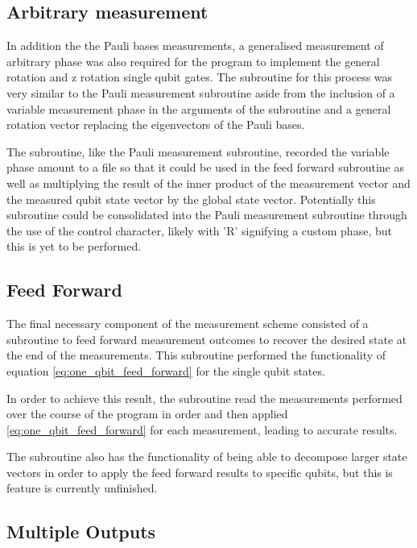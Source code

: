 \subsection{Arbitrary measurement}

In addition the the Pauli bases measurements, a generalised measurement of arbitrary phase was also required for the program to implement the general rotation and z rotation single qubit gates. The subroutine for this process was very similar to the Pauli measurement subroutine aside from the inclusion of a variable measurement phase in the arguments of the subroutine and a general rotation vector replacing the eigenvectors of the Pauli bases. 

The subroutine, like the Pauli measurement subroutine, recorded the variable phase amount to a file so that it could be used in the feed forward subroutine as well as multiplying the result of the inner product of the measurement vector and the measured qubit state vector by the global state vector. Potentially this subroutine could be consolidated into the Pauli measurement subroutine through the use of the control character, likely with 'R' signifying a custom phase, but this is yet to be performed.


\subsection{Feed Forward}

The final necessary component of the measurement scheme consisted of a subroutine to feed forward measurement outcomes to recover the desired state at the end of the measurements. This subroutine performed the functionality of equation \eqref{eq:one_qbit_feed_forward} for the single qubit states. 

In order to achieve this result, the subroutine read the measurements performed over the course of the program in order and then applied \eqref{eq:one_qbit_feed_forward} for each measurement, leading to accurate results. 

The subroutine also has the functionality of being able to decompose larger state vectors in order to apply the feed forward results to specific qubits, but this is feature is currently unfinished.


\subsection{Multiple Outputs}

